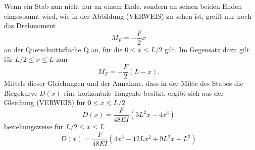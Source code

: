 Wenn ein Stab nun nicht nur an einem Ende, sondern
an seinen beiden Enden eingespannt wird, wie in 
der Abbildung (VERWEIS) zu sehen ist, greift nur 
noch das Drehmoment 
\begin{equation}
    M_{F} = -\frac{F}{2}x
\end{equation}
\noindent an der Querschnittsfläche Q an, für die
$0 \leq x \leq L/2$ gilt. Im Gegensatz dazu gilt für 
$L/2 \leq x \leq L$ nun 
\begin{equation}
    M_{F} = -\frac{F}{2}(L-x).
\end{equation}
Mittels dieser Gleichungen und der Annahme, dass 
in der Mitte des Stabes die Biegekurve $D(x)$ eine
horizontale Tangente besitzt, ergibt sich aus der Gleichung
(VERWEIS)
für $0 \leq x \leq L/2$
\begin{equation}
    D(x) = \frac{F}{48 E I} \left( 3 L^2 x - 4 x^3 \right)
\end{equation}
\noindent beziehungsweise für $L/2 \leq x \leq L$
\begin{equation}
    D(x) = \frac{F}{48 E I} \left( 4 x^3 - 12 L x^2 + 9 L^2 x - L^3 \right)
\end{equation}




\cite{sample}
